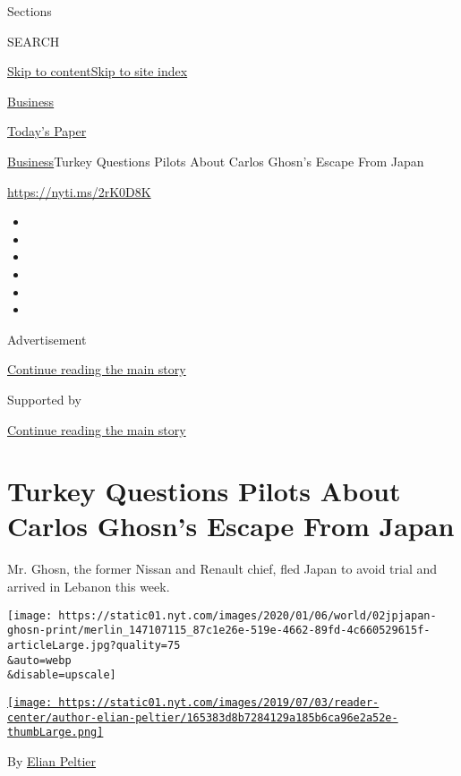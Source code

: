 Sections

SEARCH

\protect\hyperlink{site-content}{Skip to
content}\protect\hyperlink{site-index}{Skip to site index}

\href{https://www.nytimes.com/section/business}{Business}

\href{https://myaccount.nytimes.com/auth/login?response_type=cookie\&client_id=vi}{}

\href{https://www.nytimes.com/section/todayspaper}{Today's Paper}

\href{/section/business}{Business}\textbar{}Turkey Questions Pilots
About Carlos Ghosn's Escape From Japan

\url{https://nyti.ms/2rK0D8K}

\begin{itemize}
\item
\item
\item
\item
\item
\item
\end{itemize}

Advertisement

\protect\hyperlink{after-top}{Continue reading the main story}

Supported by

\protect\hyperlink{after-sponsor}{Continue reading the main story}

\hypertarget{turkey-questions-pilots-about-carlos-ghosns-escape-from-japan}{%
\section{Turkey Questions Pilots About Carlos Ghosn's Escape From
Japan}\label{turkey-questions-pilots-about-carlos-ghosns-escape-from-japan}}

Mr. Ghosn, the former Nissan and Renault chief, fled Japan to avoid
trial and arrived in Lebanon this week.

\texttt{[image: https://static01.nyt.com/images/2020/01/06/world/02jpjapan-ghosn-print/merlin\_147107115\_87c1e26e-519e-4662-89fd-4c660529615f-articleLarge.jpg?quality=75\\\&auto=webp\\\&disable=upscale]}

\href{https://www.nytimes.com/by/elian-peltier}{\texttt{[image: https://static01.nyt.com/images/2019/07/03/reader-center/author-elian-peltier/165383d8b7284129a185b6ca96e2a52e-thumbLarge.png]}}

By \href{https://www.nytimes.com/by/elian-peltier}{Elian Peltier}

